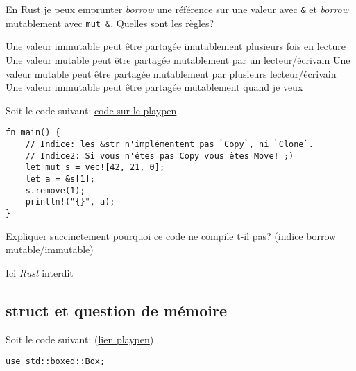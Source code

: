 \documentclass[11pt,a4paper,addpoint,answers]{exam}
\begin{document}
\begin{questions}
\question[1] En Rust je peux emprunter \emph{borrow} une référence sur une valeur avec \texttt{&}
et \emph{borrow} mutablement avec \texttt{mut &}. Quelles sont les règles?
\begin{checkboxes}
    \CorrectChoice Une valeur immutable peut être partagée imutablement plusieurs fois en lecture
    \CorrectChoice Une valeur mutable peut être partagée mutablement par un lecteur/écrivain
    \choice Une valeur mutable peut être partagée mutablement par plusieurs lecteur/écrivain
    \choice Une valeur immutable peut être partagée mutablement quand je veux
\end{checkboxes}

Soit le code suivant: \href{https://play.rust-lang.org/?version=stable&mode=debug&edition=2018&code=fn%20main()%20%7B%0A%20%20%20%20%2F%2F%20Indice%20les%20%26str%20n%27implementent%20pas%20%60Copy%60%2C%20ni%20%60Clone%60.%0A%20%20%20%20%2F%2F%20Indice2%3A%20Si%20vous%20%C3%AAtes%20pas%20Copy%20vous%20%C3%AAtes%20Move!%20%3B)%0A%20%20%20%20let%20mut%20s%20%3D%20vec!%5B42%2C%2021%2C%200%5D%3B%0A%20%20%20%20let%20a%20%3D%20%26s%5B1%5D%3B%0A%20%20%20%20s.remove(1)%3B%0A%20%20%20%20println!(%22%7B%7D%22%2C%20a)%3B%0A%7D}{code sur le playpen}

\begin{verbatim}
fn main() {
    // Indice: les &str n'implémentent pas `Copy`, ni `Clone`.
    // Indice2: Si vous n'êtes pas Copy vous êtes Move! ;)
    let mut s = vec![42, 21, 0];
    let a = &s[1];
    s.remove(1);
    println!("{}", a);
}
\end{verbatim}

\question[1] Expliquer succinctement pourquoi ce code ne compile t-il pas? (indice borrow mutable/immutable)
\ifprintanswers
\begin{solution}
Ici \emph{Rust} interdit
\end{solution}
\else
\vspace{2in}
\fi

\subsection{struct et question de mémoire}
\question[1] Soit le code suivant: (\href{https://play.rust-lang.org/?version=stable&mode=debug&edition=2018&code=use%20std%3A%3Aboxed%3A%3ABox%3B%0A%0Astruct%20Point%20%7B%0A%20%20%20%20x%3A%20i32%2C%0A%20%20%20%20y%3A%20i32%20%0A%7D%0A%0Afn%20main()%20%7B%0A%20%20%20%20let%20p%20%3D%20Point%20%7B%20x%3A%202%2C%20y%3A%204%7D%3B%0A%20%20%20%20let%20h%20%3D%20Box%3A%3Anew(Point%20%7B%20x%3A%206%2C%20y%3A%2042%20%7D)%3B%0A%7D}{lien playpen})
\begin{verbatim}
use std::boxed::Box;


\end{verbatim}
\end{questions}
\end{document}
